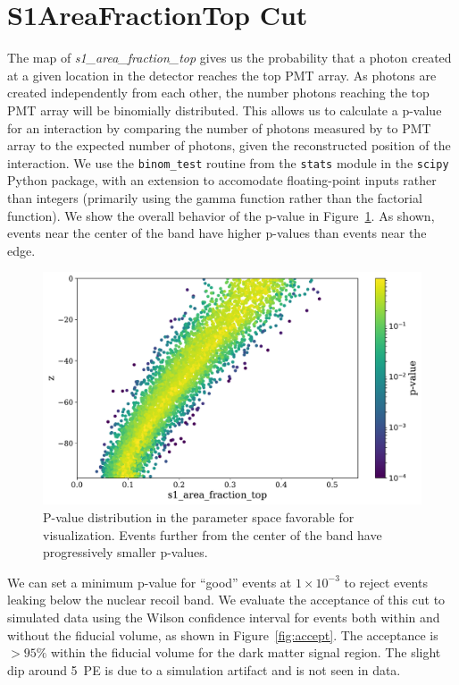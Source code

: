 \section{S1AreaFractionTop Cut}

The map of \textit{s1\_area\_fraction\_top} gives us the probability that a photon created at a given location in the detector reaches the top PMT array. As photons are created independently from each other, the number photons reaching the top PMT array will be binomially distributed. This allows us to calculate a p-value for an interaction by comparing the number of photons measured by to PMT array to the expected number of photons, given the reconstructed position of the interaction. We use the \texttt{binom\_test} routine from the \texttt{stats} module in the \texttt{scipy} Python package, with an extension to accomodate floating-point inputs rather than integers (primarily using the gamma function rather than the factorial function). We show the overall behavior of the p-value in Figure~\ref{fig:z_aft_pval}. As shown, events near the center of the band have higher p-values than events near the edge.

\begin{figure}[htb]
\centering
    \includegraphics[width=\textwidth]{figures/s1aft/z_aft_pval}
    \caption{P-value distribution in the parameter space favorable for visualization. Events further from the center of the band have progressively smaller p-values.}\label{fig:z_aft_pval}
\end{figure}

We can set a minimum p-value for ``good'' events at $1\times10^{-3}$ to reject events leaking below the nuclear recoil band. We evaluate the acceptance of this cut to simulated data using the Wilson confidence interval for events both within and without the fiducial volume, as shown in Figure~\ref{fig:accept}. The acceptance is $>95\%$ within the fiducial volume for the dark matter signal region. The slight dip around 5~PE is due to a simulation artifact and is not seen in data.


